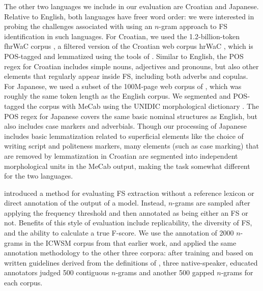 \documentclass[11pt,letterpaper]{article}
\begin{document}
The other two languages we include in our evaluation are Croatian and Japanese. Relative to English, both languages have freer word order: we were interested in probing the challenges associated with using an $n$-gram approach to FS identification in such languages. For Croatian, we used the 1.2-billion-token fhrWaC corpus \cite{snajder2013building}, a filtered version of the Croatian web corpus hrWaC \cite{ljubesic2014bs}, which is POS-tagged and lemmatized using the tools of . Similar to English, the POS regex for Croatian includes simple nouns, adjectives and pronouns, but also other elements that regularly appear inside FS, including both adverbs and copulas. For Japanese, we used a subset of the 100M-page web corpus of , which was roughly the same token length as the English corpus. We segmented and POS-tagged the corpus with MeCab \cite{Kudo:2008} using the UNIDIC morphological dictionary \cite{Den:2007}. The POS regex for Japanese covers the same basic nominal structures as English, but also includes case markers and adverbials. Though our processing of Japanese includes basic lemmatization related to superficial elements like the choice of writing script and politeness markers, many elements (such as case marking) that are removed by lemmatization in Croatian are segmented into independent morphological units in the MeCab output, making the task somewhat different for the two languages.

 introduced a method for evaluating FS extraction without a reference lexicon or direct annotation of the output of a model. Instead, $n$-grams are sampled after applying the frequency threshold and then annotated as being either an FS or not. Benefits of this style of evaluation include replicability, the diversity of FS, and the ability to calculate a true F-score.  We use the annotation of 2000 $n$-grams in the ICWSM corpus from that earlier work, and applied the same annotation methodology to the other three corpora: after training and based on written guidelines derived from the definitions of , three native-speaker, educated annotators judged 500 contiguous $n$-grams and another 500 gapped $n$-grams for each corpus. 
\end{document}
